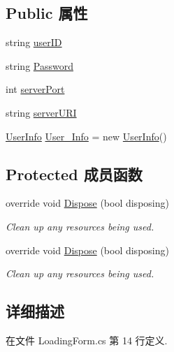 \subsection*{Public 属性}
\begin{DoxyCompactItemize}
\item 
string \hyperlink{classcustom__cloud_1_1_loading_form_a244c742a2300460159f9a2ef2d1e27a5}{user\+ID}
\item 
string \hyperlink{classcustom__cloud_1_1_loading_form_adb0a551e15e1198e4f331c9cab90fb12}{Password}
\item 
int \hyperlink{classcustom__cloud_1_1_loading_form_a44041cab60415d722862d9f569f2d6a0}{server\+Port}
\item 
string \hyperlink{classcustom__cloud_1_1_loading_form_a08eb641da0c7b75f01ea0342fa3505c3}{server\+U\+RI}
\item 
\hyperlink{classcustom__cloud_1_1_user_info}{User\+Info} \hyperlink{classcustom__cloud_1_1_loading_form_a8bbd3d30c46d9c4f9bd2fa2c66e0a8b6}{User\+\_\+\+Info} = new \hyperlink{classcustom__cloud_1_1_user_info}{User\+Info}()
\end{DoxyCompactItemize}
\subsection*{Protected 成员函数}
\begin{DoxyCompactItemize}
\item 
override void \hyperlink{classcustom__cloud_1_1_loading_form_a88dfe098eba5a4f26b4c9f351af7ee7c}{Dispose} (bool disposing)
\begin{DoxyCompactList}\small\item\em Clean up any resources being used. \end{DoxyCompactList}\item 
override void \hyperlink{classcustom__cloud_1_1_loading_form_a88dfe098eba5a4f26b4c9f351af7ee7c}{Dispose} (bool disposing)
\begin{DoxyCompactList}\small\item\em Clean up any resources being used. \end{DoxyCompactList}\end{DoxyCompactItemize}


\subsection{详细描述}


在文件 Loading\+Form.\+cs 第 14 行定义.



